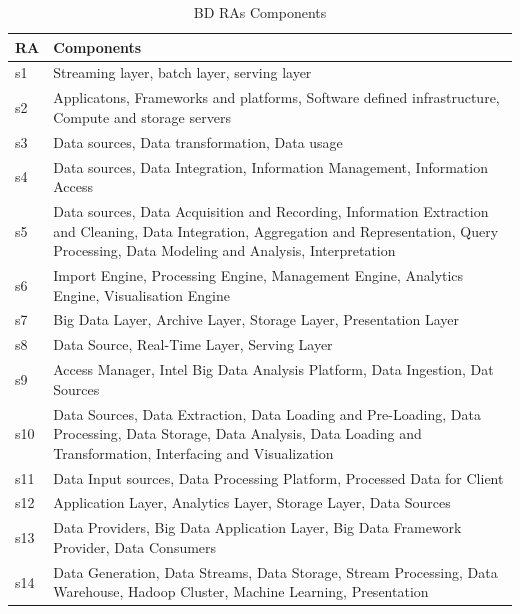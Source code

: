 \documentclass{ieeeaccess}
\begin{document}
\begin{table}
    \renewcommand*{\arraystretch}{1.4}
    \caption{BD RAs Components}
    \label{Table:BD-RAs-Components}
    \begin{tabular}{|p{0.5cm}|p{16.5cm}|}
        \hline
        RA & Components \\ 
        \hline
        s1 & Streaming layer, batch layer, serving layer   \\
        \hline
        s2 & Applicatons, Frameworks and platforms, Software defined infrastructure, Compute and storage servers  \\
        \hline
        s3 & Data sources, Data transformation, Data usage  \\
        \hline
        s4 & Data sources, Data Integration, Information Management, Information Access \\
        \hline
        s5 & Data sources, Data Acquisition and Recording, Information Extraction and Cleaning, Data Integration, Aggregation and Representation, Query Processing, Data Modeling and Analysis, Interpretation  \\
        \hline
        s6 & Import Engine, Processing Engine, Management Engine, Analytics Engine, Visualisation Engine  \\
        \hline
        s7 & Big Data Layer, Archive Layer, Storage Layer, Presentation Layer  \\
        \hline
        s8 & Data Source, Real-Time Layer, Serving Layer   \\
        \hline
        s9 & Access Manager, Intel Big Data Analysis Platform, Data Ingestion, Dat Sources  \\
        \hline
        s10 & Data Sources, Data Extraction, Data Loading and Pre-Loading, Data Processing, Data Storage, Data Analysis, Data Loading and Transformation, Interfacing and Visualization  \\
        \hline
        s11 & Data Input sources, Data Processing Platform, Processed Data for Client   \\
        \hline
        s12 & Application Layer, Analytics Layer, Storage Layer, Data Sources    \\
        \hline
        s13 & Data Providers, Big Data Application Layer, Big Data Framework Provider, Data Consumers \\
        \hline
        s14 & Data Generation, Data Streams, Data Storage, Stream Processing, Data Warehouse, Hadoop Cluster, Machine Learning, Presentation \\

\end{tabular}
\end{table}
\end{document}
